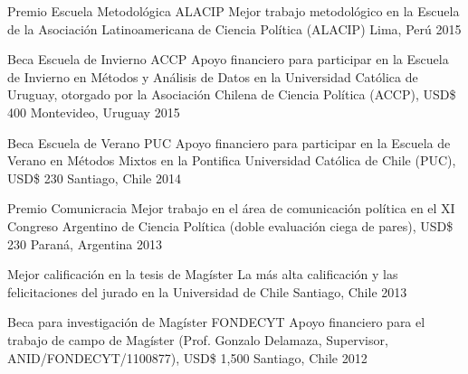 \vspace{1mm}

\begin{cvhonors}
\cvhonor
{Premio Escuela Metodológica ALACIP}
{Mejor trabajo metodológico en la Escuela de la Asociación Latinoamericana de Ciencia Política (ALACIP)}
{Lima, Perú}
{2015}
\end{cvhonors}

\vspace{1mm}

\begin{cvhonors}
\cvhonor
{Beca Escuela de Invierno ACCP}
{Apoyo financiero para participar en la Escuela de Invierno en Métodos y Análisis de Datos en la Universidad Cat\'olica de Uruguay, otorgado por la Asociación Chilena de Ciencia Política (ACCP), USD{\$} 400}
{Montevideo, Uruguay}
{ 2015}
\end{cvhonors}

\vspace{1mm}

\begin{cvhonors}
\cvhonor
{Beca Escuela de Verano PUC}
{Apoyo financiero para participar en la Escuela de Verano en Métodos Mixtos en la Pontifica Universidad Cat\'olica de Chile (PUC), USD{\$} 230}
{Santiago, Chile}
{2014} 
\end{cvhonors}

\vspace{1mm}

\begin{cvhonors}
\cvhonor
{Premio Comunicracia}
{Mejor trabajo en el área de comunicación política en el XI Congreso Argentino de Ciencia Política (doble evaluación ciega de pares), USD{\$} 230}
{Paraná, Argentina}
{2013}
\end{cvhonors}

\vspace{1mm}

\begin{cvhonors}
\cvhonor
{Mejor calificación en la tesis de Magíster}
{La más alta calificación y las felicitaciones del jurado en la Universidad de Chile}
{Santiago, Chile}
{2013}
\end{cvhonors}

\vspace{1mm}

\begin{cvhonors}
\cvhonor
{Beca para investigación de Mag\'ister FONDECYT}
{Apoyo financiero para el trabajo de campo de Magíster (Prof. Gonzalo Delamaza, Supervisor, ANID/FONDECYT/1100877), USD{\$} 1,500}
{Santiago, Chile}
{2012}
\end{cvhonors}

\vspace{1mm}
